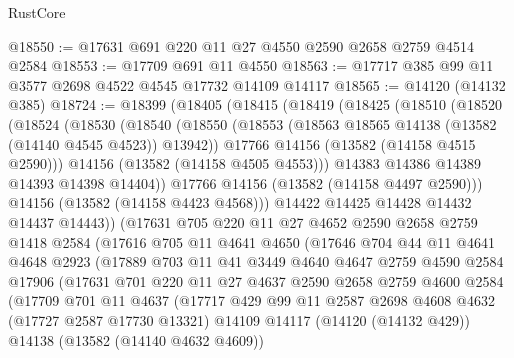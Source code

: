\begin{lexlean}{RustCore}
\begin{coremodule}
@18550 := @17631 @691 @220 @11 @27 @4550 @2590 @2658 @2759 @4514 @2584
@18553 := @17709 @691 @11 @4550
@18563 := @17717 @385 @99 @11 @3577 @2698 @4522 @4545 @17732 @14109 @14117
@18565 := @14120 (@14132 @385)
@18724 := @18399
    (@18405
      (@18415
        (@18419
          (@18425
            (@18510
              (@18520
                (@18524
                  (@18530
                    (@18540
                      (@18550
                        (@18553 (@18563 @18565 @14138 (@13582 (@14140 @4545 @4523)) @13942))
                        @17766
                        @14156
                        (@13582 (@14158 @4515 @2590)))
                      @14156
                      (@13582 (@14158 @4505 @4553)))
                    @14383
                    @14386
                    @14389
                    @14393
                    @14398
                    @14404))
                @17766
                @14156
                (@13582 (@14158 @4497 @2590)))
              @14156
              (@13582 (@14158 @4423 @4568)))
            @14422
            @14425
            @14428
            @14432
            @14437
            @14443))
        (@17631
          @705
          @220
          @11
          @27
          @4652
          @2590
          @2658
          @2759
          @1418
          @2584
          (@17616
            @705
            @11
            @4641
            @4650
            (@17646
              @704
              @44
              @11
              @4641
              @4648
              @2923
              (@17889
                @703
                @11
                @41
                @3449
                @4640
                @4647
                @2759
                @4590
                @2584
                @17906
                (@17631
                  @701
                  @220
                  @11
                  @27
                  @4637
                  @2590
                  @2658
                  @2759
                  @4600
                  @2584
                  (@17709
                    @701
                    @11
                    @4637
                    (@17717
                      @429
                      @99
                      @11
                      @2587
                      @2698
                      @4608
                      @4632
                      (@17727 @2587 @17730 @13321)
                      @14109
                      @14117
                      (@14120 (@14132 @429))
                      @14138
                      (@13582 (@14140 @4632 @4609))

\end{coremodule}
\end{lexlean}
